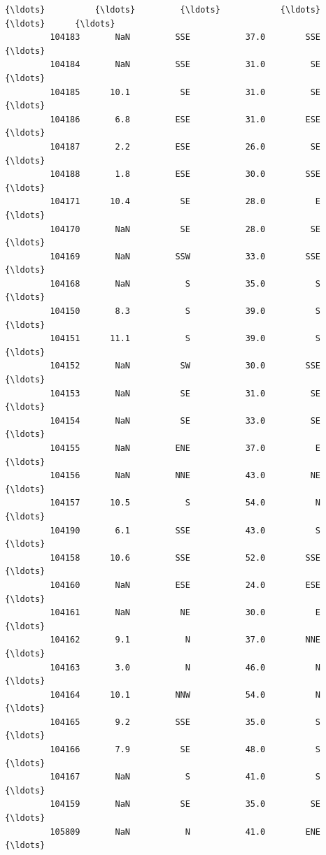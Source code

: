 \documentclass[11pt]{article}
\begin{document}
\begin{Verbatim}[commandchars=\\\{\}]
         {\ldots}          {\ldots}         {\ldots}            {\ldots}        {\ldots}      {\ldots}        
         104183       NaN         SSE           37.0        SSE      {\ldots}        
         104184       NaN         SSE           31.0         SE      {\ldots}        
         104185      10.1          SE           31.0         SE      {\ldots}        
         104186       6.8         ESE           31.0        ESE      {\ldots}        
         104187       2.2         ESE           26.0         SE      {\ldots}        
         104188       1.8         ESE           30.0        SSE      {\ldots}        
         104171      10.4          SE           28.0          E      {\ldots}        
         104170       NaN          SE           28.0         SE      {\ldots}        
         104169       NaN         SSW           33.0        SSE      {\ldots}        
         104168       NaN           S           35.0          S      {\ldots}        
         104150       8.3           S           39.0          S      {\ldots}        
         104151      11.1           S           39.0          S      {\ldots}        
         104152       NaN          SW           30.0        SSE      {\ldots}        
         104153       NaN          SE           31.0         SE      {\ldots}        
         104154       NaN          SE           33.0         SE      {\ldots}        
         104155       NaN         ENE           37.0          E      {\ldots}        
         104156       NaN         NNE           43.0         NE      {\ldots}        
         104157      10.5           S           54.0          N      {\ldots}        
         104190       6.1         SSE           43.0          S      {\ldots}        
         104158      10.6         SSE           52.0        SSE      {\ldots}        
         104160       NaN         ESE           24.0        ESE      {\ldots}        
         104161       NaN          NE           30.0          E      {\ldots}        
         104162       9.1           N           37.0        NNE      {\ldots}        
         104163       3.0           N           46.0          N      {\ldots}        
         104164      10.1         NNW           54.0          N      {\ldots}        
         104165       9.2         SSE           35.0          S      {\ldots}        
         104166       7.9          SE           48.0          S      {\ldots}        
         104167       NaN           S           41.0          S      {\ldots}        
         104159       NaN          SE           35.0         SE      {\ldots}        
         105809       NaN           N           41.0        ENE      {\ldots}        
         

\end{Verbatim}
\end{document}
